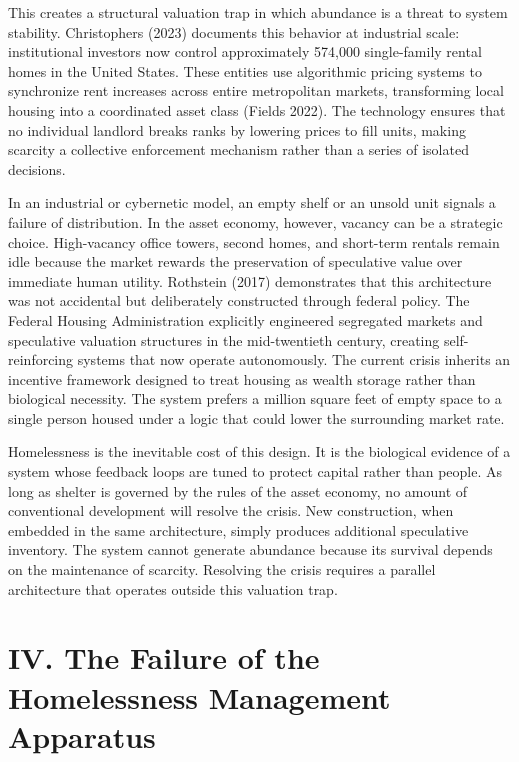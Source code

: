 \documentclass[
  12pt,
]{article}
\begin{document}
This creates a structural valuation trap in which abundance is a threat to system stability. Christophers (2023) documents this behavior at industrial scale: institutional investors now control approximately 574,000 single-family rental homes in the United States. These entities use algorithmic pricing systems to synchronize rent increases across entire metropolitan markets, transforming local housing into a coordinated asset class (Fields 2022). The technology ensures that no individual landlord breaks ranks by lowering prices to fill units, making scarcity a collective enforcement mechanism rather than a series of isolated decisions.

In an industrial or cybernetic model, an empty shelf or an unsold unit signals a failure of distribution. In the asset economy, however, vacancy can be a strategic choice. High-vacancy office towers, second homes, and short-term rentals remain idle because the market rewards the preservation of speculative value over immediate human utility. Rothstein (2017) demonstrates that this architecture was not accidental but deliberately constructed through federal policy. The Federal Housing Administration explicitly engineered segregated markets and speculative valuation structures in the mid-twentieth century, creating self-reinforcing systems that now operate autonomously. The current crisis inherits an incentive framework designed to treat housing as wealth storage rather than biological necessity. The system prefers a million square feet of empty space to a single person housed under a logic that could lower the surrounding market rate.

Homelessness is the inevitable cost of this design. It is the biological evidence of a system whose feedback loops are tuned to protect capital rather than people. As long as shelter is governed by the rules of the asset economy, no amount of conventional development will resolve the crisis. New construction, when embedded in the same architecture, simply produces additional speculative inventory. The system cannot generate abundance because its survival depends on the maintenance of scarcity. Resolving the crisis requires a parallel architecture that operates outside this valuation trap.

\hypertarget{iv.-the-failure-of-the-homelessness-management-apparatus}{%
\section{IV. The Failure of the Homelessness Management Apparatus}\label{iv.-the-failure-of-the-homelessness-management-apparatus}}
\end{document}
